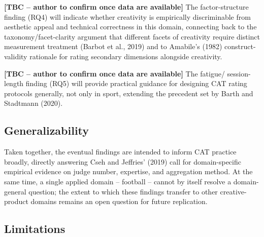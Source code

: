 \documentclass[
  12pt,
]{article}
\begin{document}
\textbf{{[}TBC -- author to confirm once data are available{]}} The
factor-structure finding (RQ4) will indicate whether creativity is
empirically discriminable from aesthetic appeal and technical
correctness in this domain, connecting back to the
taxonomy/facet-clarity argument that different facets of creativity
require distinct measurement treatment (Barbot et al., 2019) and to
Amabile's (1982) construct-validity rationale for rating secondary
dimensions alongside creativity.

\textbf{{[}TBC -- author to confirm once data are available{]}} The
fatigue/ session-length finding (RQ5) will provide practical guidance
for designing CAT rating protocols generally, not only in sport,
extending the precedent set by Barth and Stadtmann (2020).

\subsection{Generalizability}\label{generalizability}

Taken together, the eventual findings are intended to inform CAT
practice broadly, directly answering Cseh and Jeffries' (2019) call for
domain-specific empirical evidence on judge number, expertise, and
aggregation method. At the same time, a single applied domain --
football -- cannot by itself resolve a domain-general question; the
extent to which these findings transfer to other creative-product
domains remains an open question for future replication.

\subsection{Limitations}\label{limitations}
\end{document}
